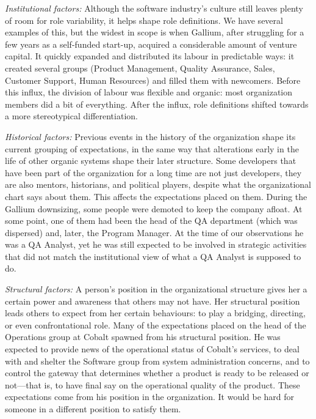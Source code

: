 \documentclass[10pt, conference, compsocconf]{IEEEtran}
\begin{document}
\emph{Institutional factors:} Although the software industry's culture still leaves plenty of room for role variability, it helps shape role definitions. We have several examples of this, but the widest in scope is when Gallium, after struggling for a few years as a self-funded start-up, acquired a considerable amount of venture capital. It quickly expanded and distributed its labour in predictable ways: it created several groups (Product Management, Quality Assurance, Sales, Customer Support, Human Resources) and filled them with newcomers. Before this influx, the division of labour was flexible and organic: most organization members did a bit of everything. After the influx, role definitions shifted towards a more stereotypical differentiation.

\emph{Historical factors:} Previous events in the history of the organization shape its current grouping of expectations, in the same way that alterations early in the life of other organic systems shape their later structure. Some developers that have been part of the organization for a long time are not just developers, they are also mentors, historians, and political players, despite what the organizational chart says about them. This affects the expectations placed on them. During the Gallium downsizing, some people were demoted to keep the company afloat. At some point, one of them had been the head of the QA department (which was dispersed) and, later, the Program Manager. At the time of our observations he was a QA Analyst, yet he was still expected to be involved in strategic activities that did not match the institutional view of what a QA Analyst is supposed to do.

\emph{Structural factors:} A person's position in the organizational structure gives her a certain power and awareness that others may not have. Her structural position leads others to expect from her certain behaviours: to play a bridging, directing, or even confrontational role. Many of the expectations placed on the head of the Operations group at Cobalt spawned from his structural position. He was expected to provide news of the operational status of Cobalt's services, to deal with and shelter the Software group from system administration concerns, and to control the gateway that determines whether a product is ready to be released or not---that is, to have final say on the operational quality of the product. These expectations come from his position in the organization. It would be hard for someone in a different position to satisfy them.
\end{document}
